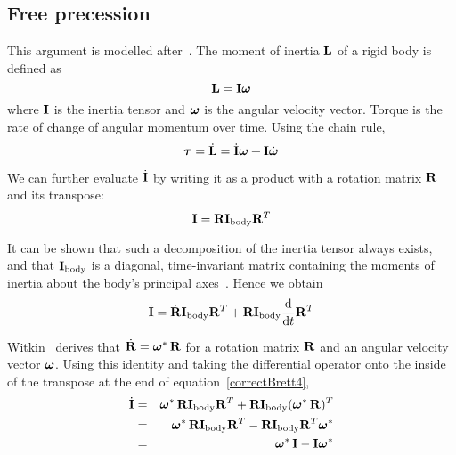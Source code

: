 \subsection{Free precession\label{correctBrettAppendix}}

This argument is modelled after~\cite{Ruf:02}. The moment of inertia $\ve{L}$ of a rigid
body is defined as
\begin{equation}
\label{correctBrett1}
\ve{L} = \m{I}\ve{\omega}
\end{equation}
where $\m{I}$ is the inertia tensor and $\ve{\omega}$ is the angular velocity vector.
Torque is the rate of change of angular momentum over time. Using the chain rule,
\begin{equation}
\label{correctBrett2}
\ve{\tau} = \dot{\ve{L}} = \dot{\m{I}}\ve{\omega} + \m{I}\dot{\ve{\omega}}
\end{equation}

We can further evaluate $\dot{\m{I}}$ by writing it as a product with a rotation matrix
$\m{R}$ and its transpose:
\begin{equation}
\label{correctBrett3}
\m{I} = \m{R}\m{I}_\mathrm{body}\m{R}^T
\end{equation}

It can be shown that such a decomposition of the inertia tensor always exists, and that
$\m{I}_\mathrm{body}$ is a diagonal, time-invariant matrix containing the moments
of inertia about the body's principal axes~\cite{Feynman:63}. Hence we obtain
\begin{equation}
\label{correctBrett4}
\dot{\m{I}} = \dot{\m{R}}\m{I}_\mathrm{body}\m{R}^T +
    \m{R}\m{I}_\mathrm{body}\frac{\diff}{\diff t}\m{R}^T
\end{equation}

Witkin~\cite{BaraffWitkin:97} derives that $\dot{\m{R}} = \dual{\ve{\omega}}\,\m{R}$
for a rotation matrix $\m{R}$ and an angular velocity vector $\ve{\omega}$.
Using this identity and taking the differential operator onto the inside of the
transpose at the end of equation~\ref{correctBrett4},
\begin{eqnarray}
\dot{\m{I}} &=& \dual{\ve{\omega}}\,\m{R}\m{I}_\mathrm{body}\m{R}^T +
    \m{R}\m{I}_\mathrm{body}(\dual{\ve{\omega}}\,\m{R})^T \nonumber\\
&=& \dual{\ve{\omega}}\,\m{R}\m{I}_\mathrm{body}\m{R}^T -
    \m{R}\m{I}_\mathrm{body}\m{R}^T\dual{\ve{\omega}} \nonumber\\
&=& \dual{\ve{\omega}}\,\m{I} - \m{I}\dual{\ve{\omega}} \label{correctBrett5}
\end{eqnarray}

